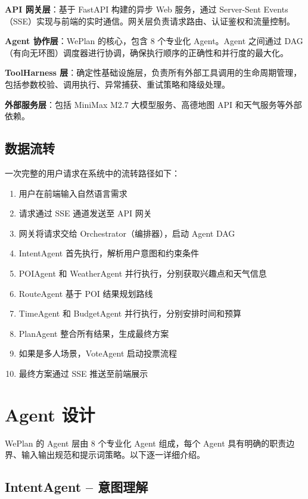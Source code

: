 \documentclass[12pt,a4paper]{ctexart}
\begin{document}
\textbf{API 网关层}：基于 FastAPI 构建的异步 Web 服务，通过 Server-Sent Events（SSE）实现与前端的实时通信。网关层负责请求路由、认证鉴权和流量控制。

\textbf{Agent 协作层}：WePlan 的核心，包含 8 个专业化 Agent。Agent 之间通过 DAG（有向无环图）调度器进行协调，确保执行顺序的正确性和并行度的最大化。

\textbf{ToolHarness 层}：确定性基础设施层，负责所有外部工具调用的生命周期管理，包括参数校验、调用执行、异常捕获、重试策略和降级处理。

\textbf{外部服务层}：包括 MiniMax M2.7 大模型服务、高德地图 API 和天气服务等外部依赖。

\subsection{数据流转}

一次完整的用户请求在系统中的流转路径如下：

\begin{enumerate}[leftmargin=2em]
  \item 用户在前端输入自然语言需求
  \item 请求通过 SSE 通道发送至 API 网关
  \item 网关将请求交给 Orchestrator（编排器），启动 Agent DAG
  \item IntentAgent 首先执行，解析用户意图和约束条件
  \item POIAgent 和 WeatherAgent 并行执行，分别获取兴趣点和天气信息
  \item RouteAgent 基于 POI 结果规划路线
  \item TimeAgent 和 BudgetAgent 并行执行，分别安排时间和预算
  \item PlanAgent 整合所有结果，生成最终方案
  \item 如果是多人场景，VoteAgent 启动投票流程
  \item 最终方案通过 SSE 推送至前端展示
\end{enumerate}

\newpage

\section{Agent 设计}

WePlan 的 Agent 层由 8 个专业化 Agent 组成，每个 Agent 具有明确的职责边界、输入输出规范和提示词策略。以下逐一详细介绍。

\subsection{IntentAgent -- 意图理解}
\end{document}
